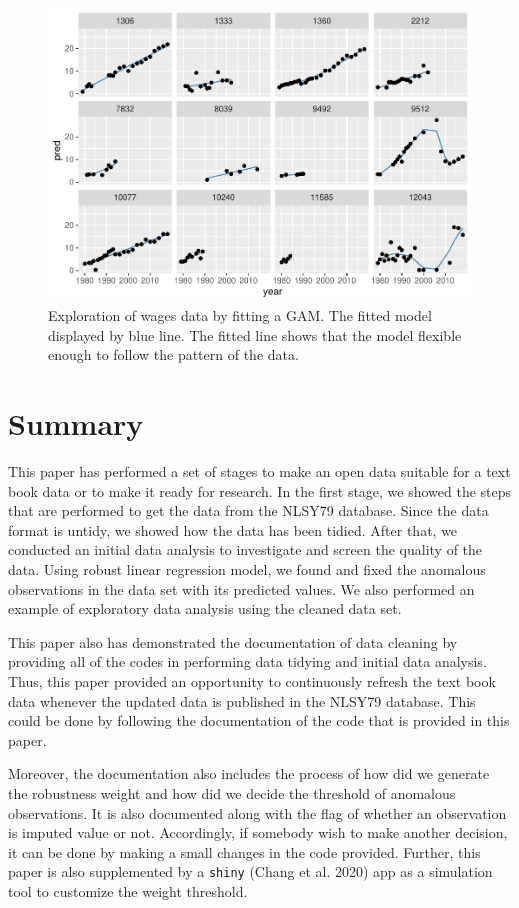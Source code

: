 \documentclass{article}
\begin{document}
\begin{figure}
\centering
\includegraphics{figures/gam-plot-1.pdf}
\caption{Exploration of wages data by fitting a GAM. The fitted model displayed by blue line. The fitted line shows that the model flexible enough to follow the pattern of the data.}
\end{figure}

\hypertarget{summary}{%
\section{Summary}\label{summary}}

This paper has performed a set of stages to make an open data suitable for a text book data or to make it ready for research. In the first stage, we showed the steps that are performed to get the data from the NLSY79 database. Since the data format is untidy, we showed how the data has been tidied. After that, we conducted an initial data analysis to investigate and screen the quality of the data. Using robust linear regression model, we found and fixed the anomalous observations in the data set with its predicted values. We also performed an example of exploratory data analysis using the cleaned data set.

This paper also has demonstrated the documentation of data cleaning by providing all of the codes in performing data tidying and initial data analysis. Thus, this paper provided an opportunity to continuously refresh the text book data whenever the updated data is published in the NLSY79 database. This could be done by following the documentation of the code that is provided in this paper.

Moreover, the documentation also includes the process of how did we generate the robustness weight and how did we decide the threshold of anomalous observations. It is also documented along with the flag of whether an observation is imputed value or not. Accordingly, if somebody wish to make another decision, it can be done by making a small changes in the code provided. Further, this paper is also supplemented by a \texttt{shiny} (Chang et al. 2020) app as a simulation tool to customize the weight threshold.
\end{document}
